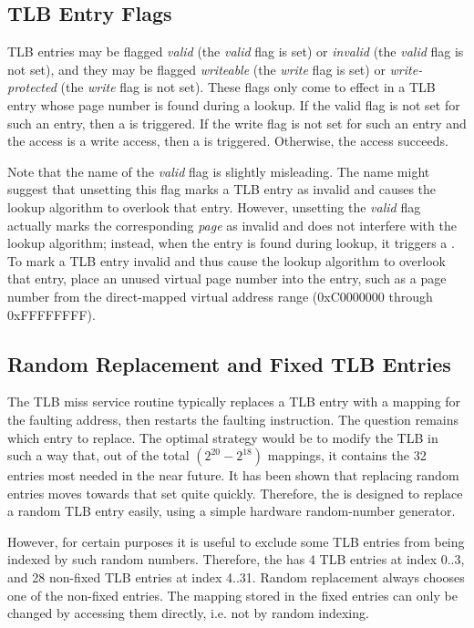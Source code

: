 \subsection{TLB Entry Flags}

TLB entries may be flagged {\it valid} (the {\it valid} flag is set) or {\it invalid} (the {\it valid} flag is not set), and they may be flagged {\it writeable} (the {\it write} flag is set) or {\it write-protected} (the {\it write} flag is not set). These flags only come to effect in a TLB entry whose page number is found during a lookup. If the valid flag is not set for such an entry, then a  is triggered. If the write flag is not set for such an entry and the access is a write access, then a  is triggered. Otherwise, the access succeeds. 

Note that the name of the {\it valid} flag is slightly misleading. The name might suggest that unsetting this flag marks a TLB entry as invalid and causes the lookup algorithm to overlook that entry. However, unsetting the {\it valid} flag actually marks the corresponding {\it page} as invalid and does not interfere with the lookup algorithm; instead, when the entry is found during lookup, it triggers a . To mark a TLB entry invalid and thus cause the lookup algorithm to overlook that entry, place an unused virtual page number into the entry, such as a page number from the direct-mapped virtual address range (0xC0000000 through 0xFFFFFFFF).

\subsection{Random Replacement and Fixed TLB Entries}

The TLB miss service routine typically replaces a TLB entry with a mapping for the faulting address, then restarts the faulting instruction. The question remains which entry to replace. The optimal strategy would be to modify the TLB in such a way that, out of the total $(2^{20} - 2^{18})$ mappings, it contains the 32 entries most needed in the near future. It has been shown that replacing random entries moves towards that set quite quickly. Therefore, the \eco is designed to replace a random TLB entry easily, using a simple hardware random-number generator.

However, for certain purposes it is useful to exclude some TLB entries from being indexed by such random numbers. Therefore, the \eco has 4  TLB entries at index 0..3, and 28 non-fixed TLB entries at index 4..31. Random replacement always chooses one of the non-fixed entries. The mapping stored in the fixed entries can only be changed by accessing them directly, i.e. not by random indexing.

